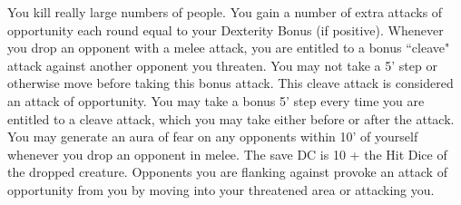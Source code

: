 \combatfeat
{You kill really large numbers of people.}
{You gain a number of extra attacks of opportunity each round equal to your Dexterity Bonus (if positive).}
{Whenever you drop an opponent with a melee attack, you are entitled to a bonus ``cleave" attack against another opponent you threaten. You may not take a 5' step or otherwise move before taking this bonus attack. This cleave attack is considered an attack of opportunity.}
{You may take a bonus 5' step every time you are entitled to a cleave attack, which you may take either before or after the attack.}
{You may generate an aura of fear on any opponents within 10' of yourself whenever you drop an opponent in melee. The save DC is 10 + the Hit Dice of the dropped creature.}
{Opponents you are flanking against provoke an attack of opportunity from you by moving into your threatened area or attacking you.}